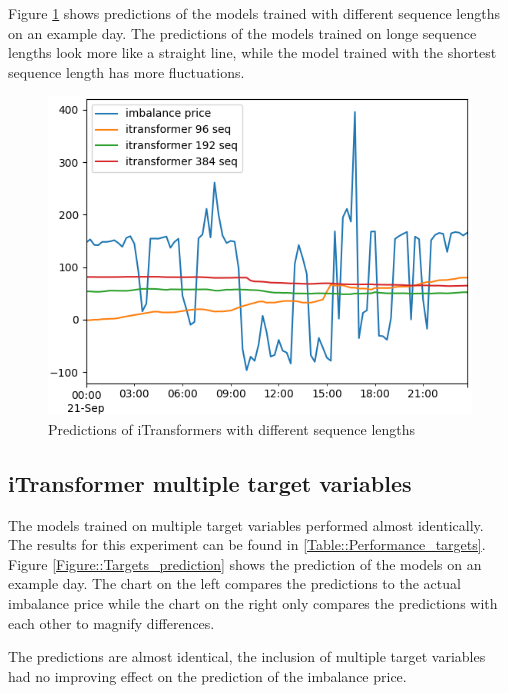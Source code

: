 \documentclass[class=scrbook, crop=false]{standalone}
\begin{document}
Figure \ref{Result::iTransformer_sequence_length} shows predictions of the models trained with different sequence lengths on an example day.
The predictions of the models trained on longe sequence lengths look more like a straight line, while the model trained with the shortest sequence length has more fluctuations.

\begin{figure}
  \centering
  \includegraphics[width=.8\linewidth]{../images/results/itransformer_sequence_length_results.png}
  \caption{Predictions of iTransformers with different sequence lengths}
\label{Result::iTransformer_sequence_length}
\end{figure}

\subsection{iTransformer multiple target variables}

The models trained on multiple target variables performed almost identically.
The results for this experiment can be found in \ref{Table::Performance_targets}.
Figure \ref{Figure::Targets_prediction} shows the prediction of the models on an example day.
The chart on the left compares the predictions to the actual imbalance price while the chart on the right only compares the predictions with each other to magnify differences.

The predictions are almost identical, the inclusion of multiple target variables had no improving effect on the prediction of the imbalance price.
\end{document}

